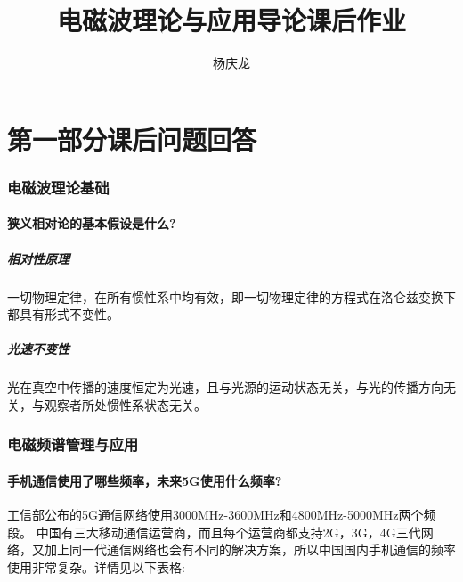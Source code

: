 \documentclass[UTF8]{ctexart}
\begin{document}
\title{电磁波理论与应用导论课后作业}
\author{杨庆龙}
\maketitle

\part{第一部分\quad 课后问题回答}
\section{电磁波理论基础}
\subsection{狭义相对论的基本假设是什么?}
\subsubsection{相对性原理}
一切物理定律，在所有惯性系中均有效，即一切物理定律的方程式在洛仑兹变换下都具有形式不变性。
\subsubsection{光速不变性}
光在真空中传播的速度恒定为光速，且与光源的运动状态无关，与光的传播方向无关，与观察者所处惯性系状态无关。
\section{电磁频谱管理与应用}
\subsection{手机通信使用了哪些频率，未来5G使用什么频率?}
工信部公布的5G通信网络使用3000MHz-3600MHz和4800MHz-5000MHz两个频段。
中国有三大移动通信运营商，而且每个运营商都支持2G，3G，4G三代网络，又加上同一代通信网络也会有不同的解决方案，所以中国国内手机通信的频率使用非常复杂。详情见以下表格:
\end{document}
